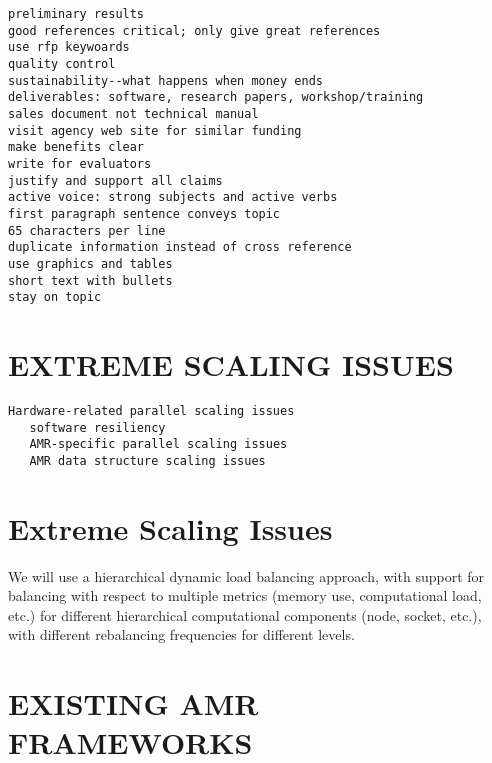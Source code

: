 \documentclass[14pt,letter]{article}
\begin{document}
\begin{verbatim}
preliminary results
good references critical; only give great references
use rfp keywoards
quality control
sustainability--what happens when money ends
deliverables: software, research papers, workshop/training
sales document not technical manual
visit agency web site for similar funding
make benefits clear
write for evaluators
justify and support all claims
active voice: strong subjects and active verbs
first paragraph sentence conveys topic
65 characters per line
duplicate information instead of cross reference
use graphics and tables
short text with bullets
stay on topic
\end{verbatim}

\section{EXTREME SCALING ISSUES} \label{s:issues}

\begin{verbatim}
Hardware-related parallel scaling issues
   software resiliency
   AMR-specific parallel scaling issues
   AMR data structure scaling issues
\end{verbatim}

\section{Extreme Scaling Issues} \label{s:scaling}



We will use a hierarchical dynamic load balancing approach, with
support for balancing with respect to multiple metrics (memory use,
computational load, etc.) for different hierarchical computational
components (node, socket, etc.), with different rebalancing
frequencies for different levels.

\section{EXISTING AMR FRAMEWORKS} \label{s:review}
\end{document}
